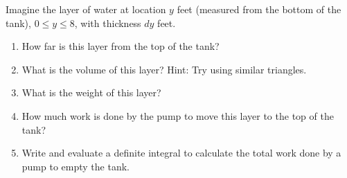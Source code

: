 \documentclass[12pt,letterpaper,fleqn]{article}
\theoremstyle{definition}
\begin{document}
\begin{enumerate}
       Imagine the layer of water at location $y$ feet (measured from the bottom of the tank), $0\leq y\leq 8$, with thickness $dy$ feet.
       \begin{enumerate}
        \item How far is this layer from the top of the tank?
        \item What is the volume of this layer? Hint: Try using similar triangles.
        \item What is the weight of this layer?
        \item How much work is done by the pump to move this layer to the top of the tank?
        \item Write and evaluate a definite integral to calculate the total work done by a pump to empty the tank.
       \end{enumerate}
       \begin{figure}[h!]%
        \centering
        \qquad\qquad
        \label{fig:example}%
       \end{figure}
\end{enumerate}
\end{document}
